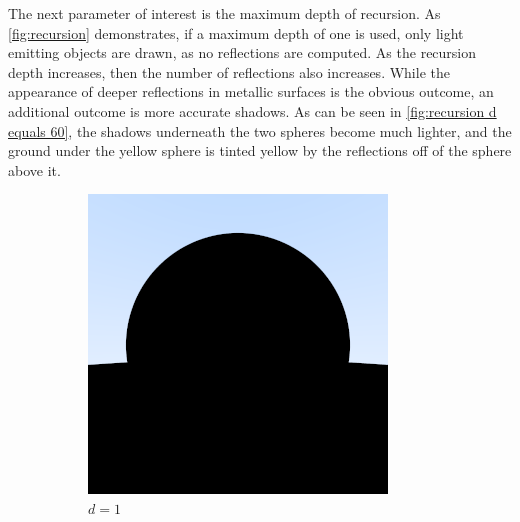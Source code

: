 \documentclass[10pt]{IEEEtran}
\begin{document}
The next parameter of interest is the maximum depth of recursion. As \cref{fig:recursion}
demonstrates, if a maximum depth of one is used, only light emitting objects are drawn, as no
reflections are computed. As the recursion depth increases, then the number of reflections also
increases. While the appearance of deeper reflections in metallic surfaces is the obvious outcome,
an additional outcome is more accurate shadows. As can be seen in \cref{fig:recursion d equals 60},
the shadows underneath the  two spheres become much lighter, and the ground under the yellow sphere
is tinted yellow by the reflections off of the sphere above it.

\begin{figure}
    \caption{ The effect of recursion depth on image quality. This is an image of two metallic
        spheres, immediately in front and behind the camera, rendered with $d$ max recursion depth.
        Note that, because the camera has no ray collision logic, it remains invisible.}
    \label{fig:recursion}
    \centering
    \begin{subfigure}[b]{0.2\textwidth}
        \centering
        \includegraphics[width=\textwidth]{images/recursiveDepth/1.png}
        \caption{$d=1$}
        \label{fig:recursion d equals 1}
    \end{subfigure}
    \begin{subfigure}[b]{0.2\textwidth}

\end{subfigure}
\end{figure}
\end{document}
